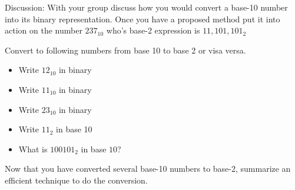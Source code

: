 \begin{problem}
    Discussion: With your group discuss how you would convert a base-10 number into its
    binary representation.  Once you have a proposed method put it into action on the
    number $237_{10}$ who's base-2 expression is $11,101,101_2$
\end{problem}

\begin{problem}
Convert to following numbers from base 10 to base 2 or visa versa.
    \begin{itemize}
        \item Write $12_{10}$ in binary \solution{
                \[ 12_{10} = 8+4 = 1\times 2^3 + 1 \times 2^2 + 0 \times 2^1 + 0 \times 2^0 = 1100_2\]
            }

        \item Write $11_{10}$ in binary 
        \item Write $23_{10}$ in binary
            \solution{
                \[ 23_{10} = 16 + 4 + 2 + 1 = 2^4 + 2^2 + 2^1 + 2^0 = 10111_2. \]
            }

        \item Write $11_2$ in base 10

        \item What is $100101_2$ in base $10$? \solution{
                \[ 100101_2 = 1 \times 2^0 + 0 \times 2^1 + 1 \times 2^2 + 0 \times 2^3 + 0 \times 2^4 + 1 \times 2^5 = 1 + 4 + 32 = 37 \]
            }
    \end{itemize}
\end{problem}

\begin{problem}
    Now that you have converted several base-10 numbers to base-2, summarize an efficient
    technique to do the conversion.
\end{problem}

% 

